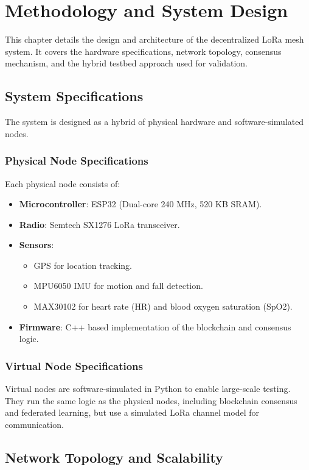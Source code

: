 \chapter{Methodology and System Design}

This chapter details the design and architecture of the decentralized LoRa mesh system. It covers the hardware specifications, network topology, consensus mechanism, and the hybrid testbed approach used for validation.

\section{System Specifications}

The system is designed as a hybrid of physical hardware and software-simulated nodes.

\subsection{Physical Node Specifications}
Each physical node consists of:
\begin{itemize}
\item \textbf{Microcontroller}: ESP32 (Dual-core 240 MHz, 520 KB SRAM).
\item \textbf{Radio}: Semtech SX1276 LoRa transceiver.
\item \textbf{Sensors}:
    \begin{itemize}
    \item GPS for location tracking.
    \item MPU6050 IMU for motion and fall detection.
    \item MAX30102 for heart rate (HR) and blood oxygen saturation (SpO2).
    \end{itemize}
\item \textbf{Firmware}: C++ based implementation of the blockchain and consensus logic.
\end{itemize}

\subsection{Virtual Node Specifications}
Virtual nodes are software-simulated in Python to enable large-scale testing. They run the same logic as the physical nodes, including blockchain consensus and federated learning, but use a simulated LoRa channel model for communication.

\section{Network Topology and Scalability}

